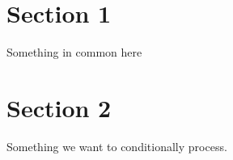 \documentclass[11pt, letterpaper]{article}
\begin{document}
\section{Section 1}
Something in common here

\section{Section 2}
Something we want to conditionally process.

\end{document}
